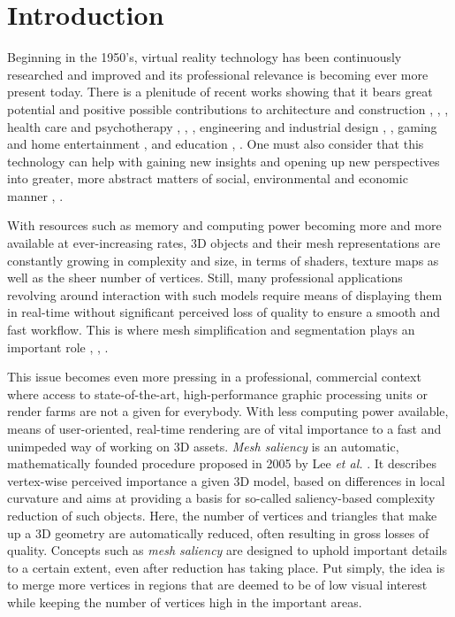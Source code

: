 \chapter{Introduction}
\label{sec:introduction}

Beginning in the 1950's, virtual reality technology \cite{steuer1992defining} has been continuously researched and improved and its professional relevance is becoming ever more present today. There is a plenitude of recent works showing that it bears great potential and positive possible contributions to architecture and construction \cite{sampaio2014application}, \cite{le2015social}, \cite{stouffs2013happening}, health care and psychotherapy \cite{baus2014moving}, \cite{merians2014rehabilitation}, \cite{de2014healthcare}, engineering and industrial design \cite{marks2014towards}, \cite{wendrich2016hybrid}, gaming and home entertainment \cite{valente2016live}, \cite{zyda2005visual} and education \cite{merchant2014effectiveness}, \cite{ott2015literature}. One must also consider that this technology can help with gaining new insights and opening up new perspectives into greater, more abstract matters of social, environmental and economic manner \cite{ovtcharova2015innovation}, \cite{nguyen2016applying}. 

With resources such as memory and computing power becoming more and more available at ever-increasing rates, 3D objects and their mesh representations are constantly growing in complexity and size, in terms of shaders, texture maps as well as the sheer number of vertices. Still, many professional applications revolving around interaction with such models require means of displaying them in real-time without significant perceived loss of quality to ensure a smooth and fast workflow. This is where mesh simplification and segmentation plays an important role \cite{wei2010feature}, \cite{shaffer2001efficient}, \cite{zhao2012saliency}.

This issue becomes even more pressing in a professional, commercial context where access to state-of-the-art, high-performance graphic processing units or render farms are not a given for everybody. With less computing power available, means of user-oriented, real-time rendering are of vital importance to a fast and unimpeded way of working on 3D assets. \textit{Mesh saliency} is an automatic, mathematically founded procedure proposed in 2005 by Lee \textit{et al.} \cite{lee2005mesh}. It describes vertex-wise perceived importance a given 3D model, based on differences in local curvature and aims at providing a basis for so-called saliency-based complexity reduction of such objects. Here, the number of vertices and triangles that make up a 3D geometry are automatically reduced, often resulting in gross losses of quality. Concepts such as \textit{mesh saliency} are designed to uphold important details to a certain extent, even after reduction has taking place. Put simply, the idea is to merge more vertices in regions that are deemed to be of low visual interest while keeping the number of vertices high in the important areas.

